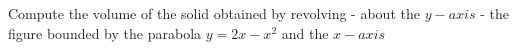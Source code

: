 
%
%
%
%
% 
% 

\question[4] Compute the volume of the solid obtained by revolving - about the $y-axis$ -
the figure bounded by the parabola $y=2x-x^2$ and the $x-axis$


